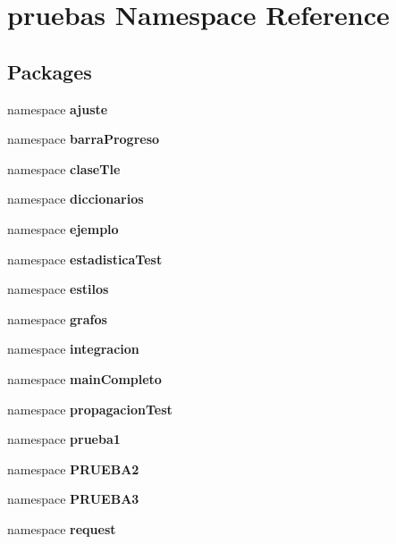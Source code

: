 \section{pruebas \-Namespace \-Reference}
\label{namespacepruebas}
\subsection*{\-Packages}
\begin{DoxyCompactItemize}
\item 
namespace {\bf ajuste}
\item 
namespace {\bf barra\-Progreso}
\item 
namespace {\bf clase\-Tle}
\item 
namespace {\bf diccionarios}
\item 
namespace {\bf ejemplo}
\item 
namespace {\bf estadistica\-Test}
\item 
namespace {\bf estilos}
\item 
namespace {\bf grafos}
\item 
namespace {\bf integracion}
\item 
namespace {\bf main\-Completo}
\item 
namespace {\bf propagacion\-Test}
\item 
namespace {\bf prueba1}
\item 
namespace {\bf \-P\-R\-U\-E\-B\-A2}
\item 
namespace {\bf \-P\-R\-U\-E\-B\-A3}
\item 
namespace {\bf request}
\end{DoxyCompactItemize}
